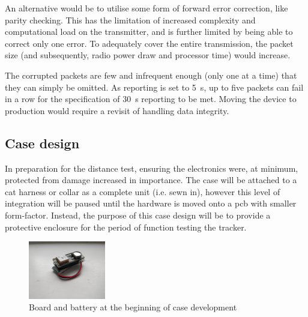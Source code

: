 An alternative would be to utilise some form of forward error correction, like parity checking.
This has the limitation of increased complexity and computational load on the transmitter,
and is further limited by being able to correct only one error. To adequately cover the
entire transmission, the packet size (and subsequently, radio power draw and processor time)
would increase.

The corrupted packets are few and infrequent enough (only one at a time) that 
they can simply be omitted. As reporting is set to \qty{5}{\s}, up to five 
packets can fail in a row for the specification of \qty{30}{\s} reporting to be met. 
Moving the device to production would require a revisit of handling data integrity.


\subsection{Case design}

In preparation for the distance test, ensuring the electronics were, at minimum,
protected from damage increased in importance. 
The case will be attached to a cat harness or collar as a complete unit (i.e. sewn in),
however this level of integration will be paused until the hardware is moved onto a \acrshort{pcb}
with smaller form-factor. Instead, the purpose of this case design will be to 
provide a protective enclosure for the period of function testing the tracker. 

\begin{figure}
    \vspace{-5pt}
    \centering
    \includegraphics[width=0.3\textwidth]{../figures/Pics/bareboard.jpg}
    \caption{Board and battery at the beginning of case development}
    \label{fig:bareboard}    
\end{figure}


